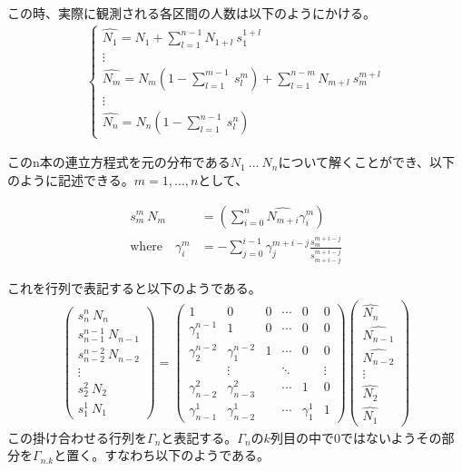 \documentclass{jsarticle}
\begin{document}
この時、実際に観測される各区間の人数は以下のようにかける。
\begin{align}
	\begin{cases}
	\hat{N_1} = N_1 + \sum_{l = 1}^{n-1}N_{1+l}\ s_1^{1+l} \\
	\vdots \\
	\hat{N_m} = N_m \left( 1 - \sum_{l = 1}^{m-1}\ s_l^m \right) + \sum_{l = 1}^{n-m} N_{m+l}\ s_m^{m+l}\\
	\vdots \\
	\hat{N_n} = N_n \left( 1 - \sum_{l = 1}^{n-1}\ s_l^n \right)
	\end{cases}
\end{align}

このn本の連立方程式を元の分布である$N_1\ \dots\ N_n$について解くことができ、以下のように記述できる。$m = 1, \dots, n$として、

\begin{align}
	s_m^m\ N_m &= \left( \sum_{i = 0}^{n} \hat{N_{m+i}} \gamma_i^m \right) \\[10pt]
	\text{where}\quad \gamma_i^m &= - \sum_{j = 0}^{i-1} \gamma_j^{m+i-j} \frac{s_m^{m+i-j}}{s_{m+i-j}^{m+i-j}}
\end{align}

これを行列で表記すると以下のようである。
\begin{align}
	\begin{pmatrix}
	s_n^n\ N_n\\[8pt]
	s_{n-1}^{n-1}\ N_{n-1}\\[8pt]
	s_{n-2}^{n-2}\ N_{n-2}\\[8pt]
	\vdots\\[8pt]
	s_2^2\ N_2\\[8pt]
	s_1^1\ N_1
	\end{pmatrix}=
	\begin{pmatrix}
	1 & 0 & 0 & \cdots &0&0\\
	\gamma_1^{n-1} & 1 & 0 & \cdots &0&0\\
	\gamma_2^{n-2} & \gamma_1^{n-2} & 1 & \cdots &0&0\\
	 & \vdots && \ddots&&\vdots\\
	 \gamma_{n-2}^2 & \gamma_{n-3}^2 &&\cdots &1 &0\\
	 \gamma_{n-1}^1 & \gamma_{n-2}^1 &&\cdots & \gamma_1^1 & 1
	\end{pmatrix}
	\begin{pmatrix}
	\hat{N_n}\\[8pt]
	\hat{N_{n-1}}\\[8pt]
	\hat{N_{n-2}}\\[8pt]
	\vdots\\[8pt]
	\hat{N_2}\\[8pt]
	\hat{N_1}
	\end{pmatrix}
\end{align}
この掛け合わせる行列を$\Gamma_n$と表記する。$\Gamma_n$の$k$列目の中で0ではないようその部分を$\Gamma_{n.k}$と置く。すなわち以下のようである。
\end{document}
